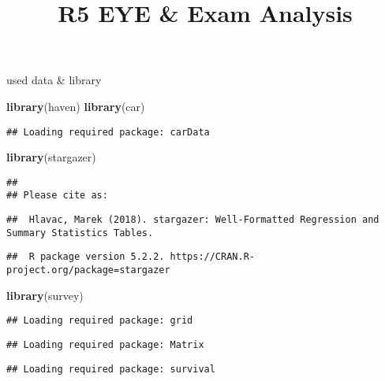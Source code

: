 \documentclass[]{article}
\title{R5 EYE \& Exam Analysis}
\author{}
\date{\vspace{-2.5em}}
\newenvironment{Shaded}{\begin{snugshade}}{\end{snugshade}}
\newcommand{\KeywordTok}[1]{\textcolor[rgb]{0.13,0.29,0.53}{\textbf{#1}}}
\newcommand{\NormalTok}[1]{#1}
\begin{document}
\maketitle

used data \& library

\begin{Shaded}
\begin{Highlighting}[]
\KeywordTok{library}\NormalTok{(haven)}
\KeywordTok{library}\NormalTok{(car)}
\end{Highlighting}
\end{Shaded}

\begin{verbatim}
## Loading required package: carData
\end{verbatim}

\begin{Shaded}
\begin{Highlighting}[]
\KeywordTok{library}\NormalTok{(stargazer)}
\end{Highlighting}
\end{Shaded}

\begin{verbatim}
## 
## Please cite as:
\end{verbatim}

\begin{verbatim}
##  Hlavac, Marek (2018). stargazer: Well-Formatted Regression and Summary Statistics Tables.
\end{verbatim}

\begin{verbatim}
##  R package version 5.2.2. https://CRAN.R-project.org/package=stargazer
\end{verbatim}

\begin{Shaded}
\begin{Highlighting}[]
\KeywordTok{library}\NormalTok{(survey)}
\end{Highlighting}
\end{Shaded}

\begin{verbatim}
## Loading required package: grid
\end{verbatim}

\begin{verbatim}
## Loading required package: Matrix
\end{verbatim}

\begin{verbatim}
## Loading required package: survival
\end{verbatim}
\end{document}
